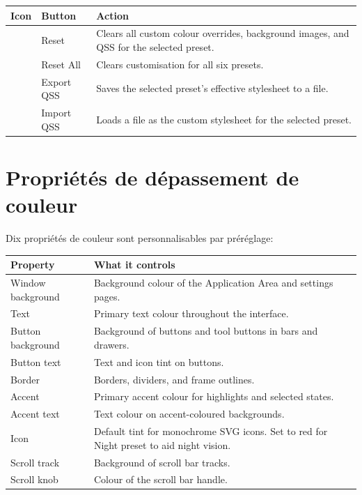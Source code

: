 \begin{longtable}{C{1.5cm}L{3.0cm}L{9.2cm}}
\toprule
{}
\color{white}\sffamily\bfseries Icon &
\color{white}\sffamily\bfseries Button &
\color{white}\sffamily\bfseries Action \\
\midrule
{}     & Reset       &
  Clears all custom colour overrides, background images, and QSS for the selected preset. \\
    & Reset All   &
  Clears customisation for all six presets. \\
 & Export QSS  &
  Saves the selected preset's effective stylesheet to a  file. \\
 & Import QSS  &
  Loads a  file as the custom stylesheet for the selected preset. \\
\bottomrule
\end{longtable}

\section{Propriétés de dépassement de couleur}

Dix propriétés de couleur sont personnalisables par préréglage:

\begin{longtable}{L{3.6cm}L{10.1cm}}
\toprule
{}
\color{white}\sffamily\bfseries Property &
\color{white}\sffamily\bfseries What it controls \\
\midrule
Window background  & Background colour of the Application Area and settings pages. \\
Text               & Primary text colour throughout the interface. \\
Button background  & Background of buttons and tool buttons in bars and drawers. \\
Button text        & Text and icon tint on buttons. \\
Border             & Borders, dividers, and frame outlines. \\
Accent             & Primary accent colour for highlights and selected states. \\
Accent text        & Text colour on accent-coloured backgrounds. \\
Icon               & Default tint for monochrome SVG icons. Set to red for Night preset to aid night vision. \\
Scroll track       & Background of scroll bar tracks. \\
Scroll knob        & Colour of the scroll bar handle. \\
\bottomrule
\end{longtable}

